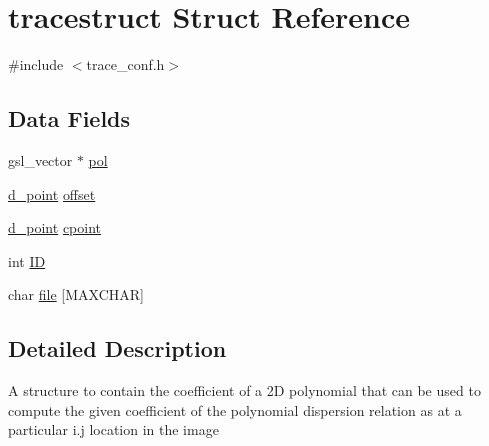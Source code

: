 \hypertarget{structtracestruct}{
\section{tracestruct Struct Reference}
\label{structtracestruct}
}


{\ttfamily \#include $<$trace\_\-conf.h$>$}\subsection*{Data Fields}
\begin{DoxyCompactItemize}
\item 
gsl\_\-vector $\ast$ \hyperlink{structtracestruct_a42797f7a46efa0ea3e5ec4c7512906e1}{pol}
\item 
\hyperlink{structd__point}{d\_\-point} \hyperlink{structtracestruct_a036bfe31dd2376d708c7ee84adfcb035}{offset}
\item 
\hyperlink{structd__point}{d\_\-point} \hyperlink{structtracestruct_a52773e2c3477372748e0c61bf33b480f}{cpoint}
\item 
int \hyperlink{structtracestruct_a57fffc0d06bc78aa385b17ee80bb5c0e}{ID}
\item 
char \hyperlink{structtracestruct_a5ac820d6af1c733d11c029728cac779d}{file} \mbox{[}MAXCHAR\mbox{]}
\end{DoxyCompactItemize}


\subsection{Detailed Description}
A structure to contain the coefficient of a 2D polynomial that can be used to compute the given coefficient of the polynomial dispersion relation as at a particular i.j location in the image 

